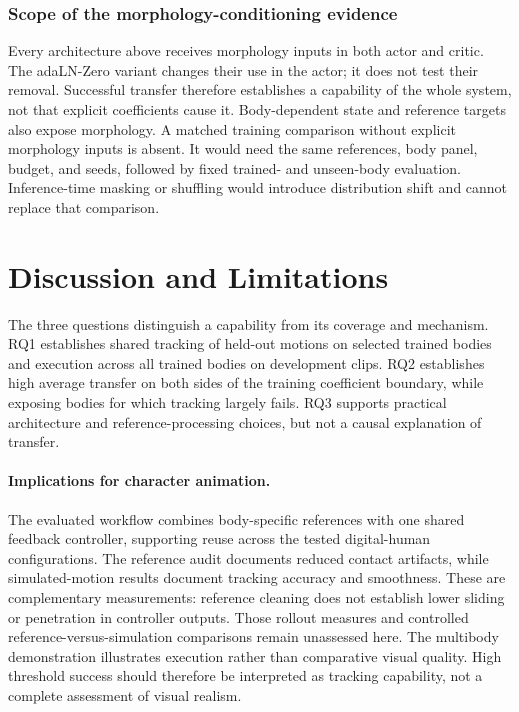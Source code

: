 \documentclass[11pt]{article}
\begin{document}
\subsubsection{Scope of the morphology-conditioning evidence}
Every architecture above receives morphology inputs in both actor and critic.
The adaLN-Zero variant changes their use in the actor; it does not test their
removal. Successful transfer therefore establishes a capability of the whole
system, not that explicit coefficients cause it. Body-dependent state and
reference targets also expose morphology.
A matched training comparison without explicit morphology inputs is absent.
It would need the same references, body panel, budget, and seeds, followed by
fixed trained- and unseen-body evaluation. Inference-time masking or shuffling
would introduce distribution shift and cannot replace that comparison.

\section{Discussion and Limitations}\label{sec:discussion}
The three questions distinguish a capability from its coverage and mechanism.
RQ1 establishes shared tracking of held-out motions on selected trained
bodies and execution across all trained bodies on development clips. RQ2
establishes high average transfer on both sides of the training coefficient
boundary, while exposing bodies for which tracking largely fails. RQ3
supports practical architecture and reference-processing choices, but not a
causal explanation of transfer.

\paragraph{Implications for character animation.}
The evaluated workflow combines body-specific references with one shared
feedback controller, supporting reuse across the tested digital-human
configurations. The reference audit documents reduced contact artifacts,
while simulated-motion results document tracking accuracy and smoothness.
These are complementary measurements: reference cleaning does not establish
lower sliding or penetration in controller outputs. Those rollout measures
and controlled reference-versus-simulation comparisons remain unassessed here.
The multibody demonstration illustrates execution rather than comparative
visual quality. High threshold success
should therefore be interpreted as tracking capability, not a complete
assessment of visual realism.
\end{document}

